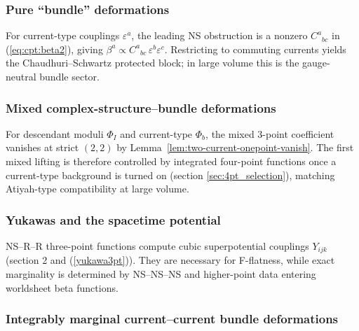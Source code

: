 \documentclass[12pt]{article}
\begin{document}
\subsubsection*{Pure ``bundle'' deformations}
For current-type couplings $\varepsilon^a$, the leading NS obstruction is a nonzero $C^{a}{}_{bc}$ in (\ref{eq:cpt:beta2}), giving $\beta^a\propto C^{a}{}_{bc}\,\varepsilon^b\varepsilon^c$. Restricting to commuting currents yields the Chaudhuri--Schwartz protected block; in large volume this is the gauge-neutral bundle sector.

\subsubsection*{Mixed complex-structure--bundle deformations}
For descendant moduli $\Phi_I$ and current-type $\Phi_b$, the mixed 3-point coefficient vanishes at strict $(2,2)$ by Lemma~\ref{lem:two-current-onepoint-vanish}. The first mixed lifting is therefore controlled by integrated four-point functions once a current-type background is turned on (section \ref{sec:4pt_selection}), matching Atiyah-type compatibility at large volume.

\subsubsection*{Yukawas and the spacetime potential}
NS--R--R three-point functions compute cubic superpotential couplings $Y_{ijk}$ (section 2 and (\ref{yukawa3pt})). They are necessary for F-flatness, while exact marginality is determined by NS--NS--NS and higher-point data entering worldsheet beta functions.
			
				\subsubsection*{Integrably marginal current--current bundle deformations}
				
\end{document}
